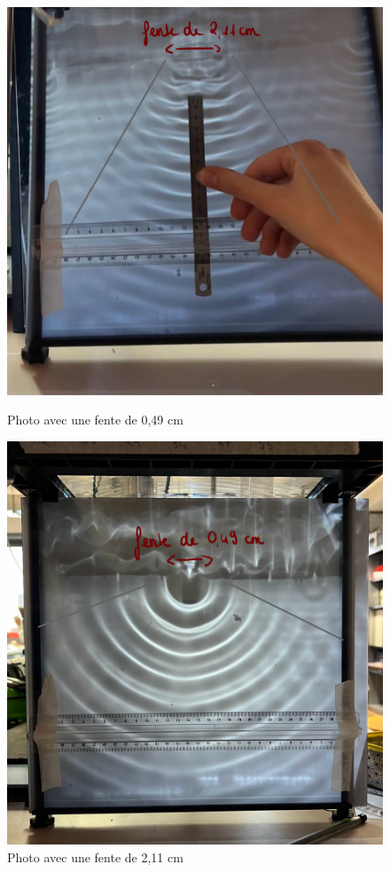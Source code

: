 \documentclass{report}
\begin{document}
\begin{figure}[H]
\centering
\begin{minipage}{0.45\textwidth}
  \centering
  \includegraphics[scale=0.145]{petitefente.jpg}
  \caption{Photo avec une fente de 0,49 cm}
  \label{fig:s1}
\end{minipage}\hfill
\begin{minipage}{0.45\textwidth}
  \centering
  \includegraphics[scale=0.14]{grandefente.jpg}
  \caption{Photo avec une fente de 2,11 cm}
  \label{fig:s2}
\end{minipage}
\end{figure}
\end{document}
